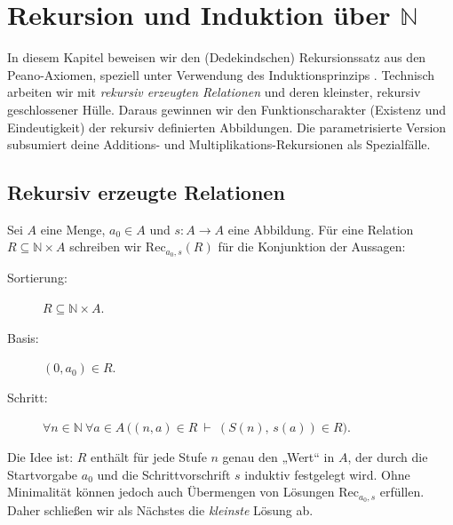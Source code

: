 \documentclass[main.tex]{subfiles}
\begin{document}

\chapter{Rekursion und Induktion über \(\mathbb{N}\)}
\label{chap:Rekursion}

In diesem Kapitel beweisen wir den (Dedekindschen) Rekursionssatz aus den
Peano-Axiomen, speziell unter Verwendung des Induktionsprinzips
. Technisch arbeiten wir mit
\emph{rekursiv erzeugten Relationen} und deren kleinster, rekursiv
geschlossener Hülle. Daraus gewinnen wir den Funktionscharakter
(Existenz und Eindeutigkeit) der rekursiv definierten Abbildungen.
Die parametrisierte Version subsumiert deine Additions- und
Multiplikations-Rekursionen als Spezialfälle.

\section{Rekursiv erzeugte Relationen}

\begin{definition}
Sei \(A\) eine Menge, \(a_0\in A\) und \(s:A\to A\) eine Abbildung.
Für eine Relation \(R\subseteq \mathbb{N}\times A\) schreiben wir
\(\mathrm{Rec}_{a_0,s}(R)\) für die Konjunktion der Aussagen:
\begin{description}
  \item[Sortierung:] \(R \subseteq \mathbb{N}\times A\).
  \item[Basis:] \((0,a_0)\in R\).
  \item[Schritt:] \(\forall n\in\mathbb{N}\ \forall a\in A\,\bigl((n,a)\in R \ \vdash\ (S(n),\,s(a))\in R\bigr)\).
\end{description}
\end{definition}

\begin{remark}
Die Idee ist: \(R\) enthält für jede Stufe \(n\) genau den „Wert“ in \(A\),
der durch die Startvorgabe \(a_0\) und die Schrittvorschrift \(s\) induktiv
festgelegt wird. Ohne Minimalität können jedoch auch Übermengen von
Lösungen \(\mathrm{Rec}_{a_0,s}\) erfüllen. Daher schließen wir als Nächstes die
\emph{kleinste} Lösung ab.
\end{remark}
\end{document}
